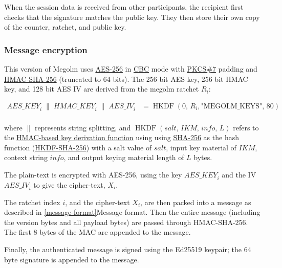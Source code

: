 \documentclass[10pt]{article}
\begin{document}
When the session data is received from other participants, the recipient
first checks that the signature matches the public key. They then store
their own copy of the counter, ratchet, and public key.

\subsubsection{Message encryption}\label{message-encryption}

This version of Megolm uses
\href{http://csrc.nist.gov/publications/fips/fips197/fips-197.pdf}{AES-256}
in
\href{http://csrc.nist.gov/publications/nistpubs/800-38a/sp800-38a.pdf}{CBC}
mode with \href{https://tools.ietf.org/html/rfc2315}{PKCS\#7} padding
and \href{https://tools.ietf.org/html/rfc2104}{HMAC-SHA-256} (truncated
to 64 bits). The 256 bit AES key, 256 bit HMAC key, and 128 bit AES IV
are derived from the megolm ratchet \(R_i\):

$\begin{aligned}
 \mathit{AES\_KEY}_{i}\;\parallel\;\mathit{HMAC\_KEY}_{i}\;\parallel\;\mathit{AES\_IV}_{i}
    &= \operatorname{HKDF}\left(0,\,R_{i},\text{"MEGOLM\_KEYS"},\,80\right) \\
\end{aligned}$

where \(\parallel\) represents string splitting, and
\(\operatorname{HKDF}\left(\mathit{salt},\,\mathit{IKM},\,\mathit{info},\,L\right)\)
refers to the \href{https://tools.ietf.org/html/rfc5869}{HMAC-based key
derivation function} using using
\href{https://tools.ietf.org/html/rfc6234}{SHA-256} as the hash function
(\href{https://tools.ietf.org/html/rfc5869}{HKDF-SHA-256}) with a salt
value of \(\mathit{salt}\), input key material of \(\mathit{IKM}\),
context string \(\mathit{info}\), and output keying material length of
\(L\) bytes.

The plain-text is encrypted with AES-256, using the key
\(\mathit{AES\_KEY}_{i}\) and the IV \(\mathit{AES\_IV}_{i}\) to give
the cipher-text, \(X_{i}\).

The ratchet index \(i\), and the cipher-text \(X_{i}\), are then packed
into a message as described in
\ref{message-format}{Message format}. Then the entire
message (including the version bytes and all payload bytes) are passed
through HMAC-SHA-256. The first 8 bytes of the MAC are appended to the
message.

Finally, the authenticated message is signed using the Ed25519 keypair;
the 64 byte signature is appended to the message.
\end{document}
